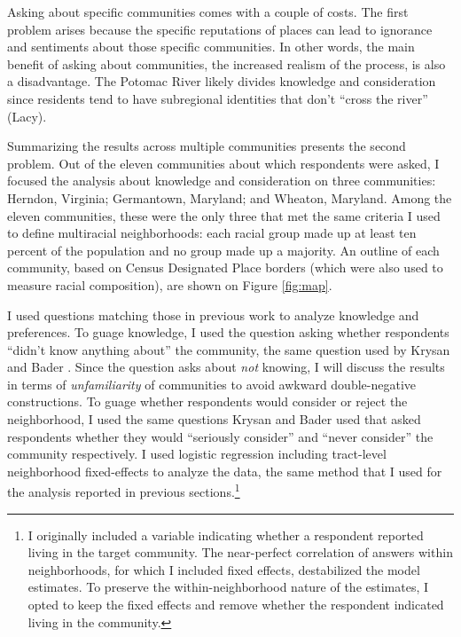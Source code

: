 \documentclass{baderart}
\begin{document}
Asking about specific communities comes with a couple of costs. The first problem arises because the specific reputations of places can lead to ignorance and sentiments about those specific communities. In other words, the main benefit of asking about communities, the increased realism of the process, is also a disadvantage. The Potomac River likely divides knowledge and consideration since residents tend to have subregional identities that don't ``cross the river'' (Lacy).

Summarizing the results across multiple communities presents the second problem. Out of the eleven communities about which respondents were asked, I focused the analysis about knowledge and consideration on three communities: Herndon, Virginia; Germantown, Maryland; and Wheaton, Maryland. Among the eleven communities, these were the only three that met the same criteria I used to define multiracial neighborhoods: each racial group made up at least ten percent of the population and no group made up a majority. An outline of each community, based on Census Designated Place borders (which were also used to measure racial composition), are shown on Figure \ref{fig:map}.

I used questions matching those in previous work to analyze knowledge and preferences. To guage knowledge, I used the question asking whether respondents ``didn't know anything about'' the community, the same question used by Krysan and Bader \citeyearpar{krysan_racial_2009}. Since the question asks about \emph{not} knowing, I will discuss the results in terms of \emph{unfamiliarity} of communities to avoid awkward double-negative constructions. To guage whether respondents would consider or reject the neighborhood, I used the same questions Krysan and Bader \citeyearpar[][\citealt{bader_community_2015}]{krysan_perceiving_2007, krysan_racial_2009} used that asked respondents whether they would ``seriously consider'' and ``never consider'' the community respectively. I used logistic regression including tract-level neighborhood fixed-effects to analyze the data, the same method that I used for the analysis reported in previous sections.\footnote{I originally included a variable indicating whether a respondent reported living in the target community. The near-perfect correlation of answers within neighborhoods, for which I included fixed effects, destabilized the model estimates. To preserve the within-neighborhood nature of the estimates, I opted to keep the fixed effects and remove whether the respondent indicated living in the community.}
\end{document}

